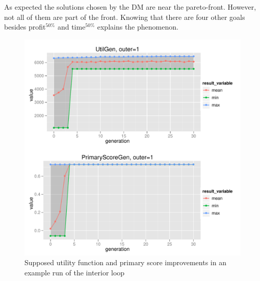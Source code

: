 As expected the solutions chosen by the DM are near the pareto-front. However,
not all of them are part of the front. Knowing that there are four other goals
besides profit$^{50\%}$ and time$^{50\%}$ explains the phenomenon.

\begin{figure}
  \centering
  \includegraphics[width=1\textwidth]{exp/uncert/pres_utilgen_01}
  \caption{Supposed utility function and primary score improvements in an
    example run of the interior loop}
  \label{pres_utilgen_01}
\end{figure}

